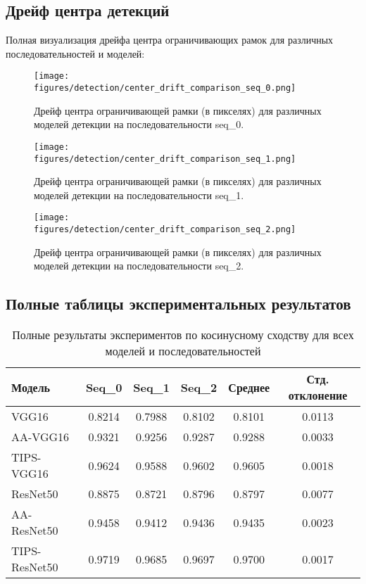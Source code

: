 \subsection{Дрейф центра детекций}
\label{appendix:additional_results:center_drift}

Полная визуализация дрейфа центра ограничивающих рамок для различных последовательностей и моделей:

\begin{figure}[ht]
\centering
\texttt{[image: figures/detection/center\_drift\_comparison\_seq\_0.png]}
\caption{Дрейф центра ограничивающей рамки (в пикселях) для различных моделей детекции на последовательности seq\_0.}
\label{fig:center_drift_seq_0}
\end{figure}

\begin{figure}[ht]
\centering
\texttt{[image: figures/detection/center\_drift\_comparison\_seq\_1.png]}
\caption{Дрейф центра ограничивающей рамки (в пикселях) для различных моделей детекции на последовательности seq\_1.}
\label{fig:center_drift_seq_1}
\end{figure}

\begin{figure}[ht]
\centering
\texttt{[image: figures/detection/center\_drift\_comparison\_seq\_2.png]}
\caption{Дрейф центра ограничивающей рамки (в пикселях) для различных моделей детекции на последовательности seq\_2.}
\label{fig:center_drift_seq_2}
\end{figure}

\subsection{Полные таблицы экспериментальных результатов}
\label{appendix:additional_results:tables}

\begin{table}[ht]
\centering
\caption{Полные результаты экспериментов по косинусному сходству для всех моделей и последовательностей}
\label{tab:full_cosine_similarity}
\begin{tabular}{|l|c|c|c|c|c|}
\hline
\textbf{Модель} & \textbf{Seq\_0} & \textbf{Seq\_1} & \textbf{Seq\_2} & \textbf{Среднее} & \textbf{Стд. отклонение} \\ \hline
VGG16 & 0.8214 & 0.7988 & 0.8102 & 0.8101 & 0.0113 \\ \hline
AA-VGG16 & 0.9321 & 0.9256 & 0.9287 & 0.9288 & 0.0033 \\ \hline
TIPS-VGG16 & 0.9624 & 0.9588 & 0.9602 & 0.9605 & 0.0018 \\ \hline
ResNet50 & 0.8875 & 0.8721 & 0.8796 & 0.8797 & 0.0077 \\ \hline
AA-ResNet50 & 0.9458 & 0.9412 & 0.9436 & 0.9435 & 0.0023 \\ \hline
TIPS-ResNet50 & 0.9719 & 0.9685 & 0.9697 & 0.9700 & 0.0017 \\ \hline
\end{tabular}
\end{table}

